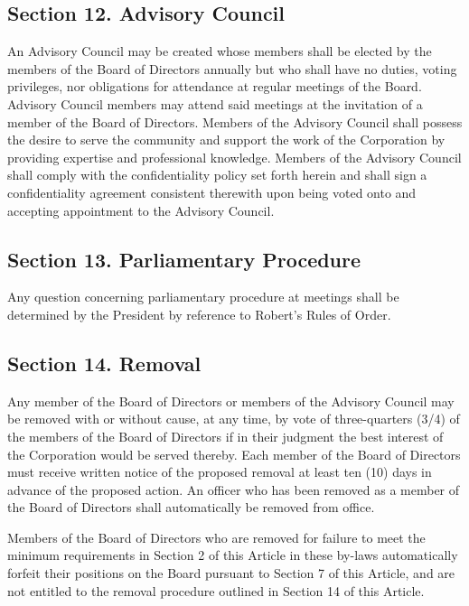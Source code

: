 \documentclass[a4paper]{article}
\begin{document}
\subsection*{Section 12. Advisory Council}

An Advisory Council may be created whose members shall be elected by the members of the Board of Directors annually but who shall have no duties, voting privileges, nor obligations for attendance at regular meetings of the Board.  Advisory Council members may attend said meetings at the invitation of a member of the Board of Directors.  Members of the Advisory Council shall possess the desire to serve the community and support the work of the Corporation by providing expertise and professional knowledge.  Members of the Advisory Council shall comply with the confidentiality policy set forth herein and shall sign a confidentiality agreement consistent therewith upon being voted onto and accepting appointment to the Advisory Council.

\subsection*{Section 13. Parliamentary Procedure}

Any question concerning parliamentary procedure at meetings shall be determined by the President by reference to Robert's Rules of Order.

\subsection*{Section 14. Removal}

Any member of the Board of Directors or members of the Advisory Council may be removed with or without cause, at any time, by vote of three-quarters (3/4) of the members of the Board of Directors if in their judgment the best interest of the Corporation would be served thereby.  Each member of the Board of Directors must receive written notice of the proposed removal at least ten (10) days in advance of the proposed action.  An officer who has been removed as a member of the Board of Directors shall automatically be removed from office.

Members of the Board of Directors who are removed for failure to meet the minimum requirements in Section 2 of this Article in these by-laws automatically forfeit their positions on the Board pursuant to Section 7 of this Article, and are not entitled to the removal procedure outlined in Section 14 of this Article.
\end{document}
